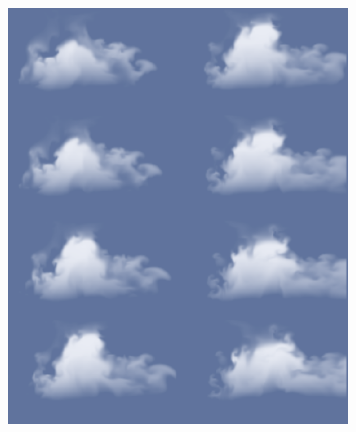 \begin{figure}[h!]
	\label{fig:Simulation_of_Cloud_Dynamics_on_Graphics_Hardware}
	\centering
	\includegraphics[width=90mm]{images/Simulation_of_Cloud_Dynamics_on_Graphics_Hardware.PNG}
	\caption{\citet{HarrisEtAl03}}
\end{figure}